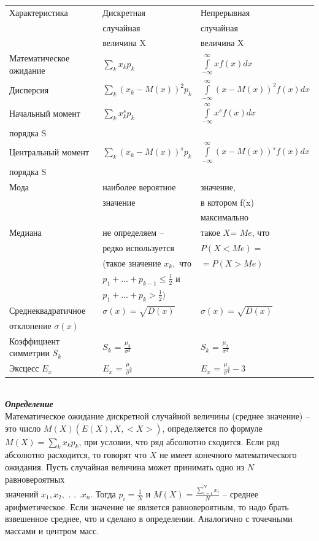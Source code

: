 \documentclass[russian, 12pt, fleqn]{article}
\begin{document}
\begin{tabular}[b]{ | l | l | l | }
\hline
Характеристика &  Дискретная & Непрерывная   \\
 &  случайная  & случайная  \\
 &  величина X  & величина X  \\
\hline
Математическое ожидание &  $ \sum\limits_{k} x_kp_k$ & $\int\limits_{-\infty}^{\infty}xf(x)dx$\\
Дисперсия & $\sum\limits_{k}^{}(x_k-M(x))^2p_k$ & $\int\limits_{-\infty}^{\infty}(x- M(x))^2f(x)dx$\\
Начальный момент & $\sum\limits_{k} x^s_kp_k$ & $\int\limits_{-\infty}^{\infty}x^sf(x)dx$\\
порядка S& &\\
Центральный момент& $\sum\limits_{k}^{}(x_k-M(x))^sp_k$& $\int\limits_{-\infty}^{\infty}(x- M(x))^sf(x)dx$\\
порядка S& &\\
Мода&наиболее вероятное&значение, \\
& значение& в котором f(x)\\
& &максимально\\
Медиана&не определяем -- &такое $X$= $Me$, что \\
&редко используется&$P(X < Me)=$\\
&(такое значение $x_k,$ что &  $=P(X > Me)$\\
& $p_1+ ...+p_{k - 1} \leq \frac{1}{2}$ и&\\
& $p_1+ ...+p_{k} > \frac{1}{2})$ & \\
Среднеквадратичное  & $\sigma(x) = \sqrt{D(x)}$ & $\sigma(x) = \sqrt{D(x)}$\\
отклонение $\sigma(x)$ & &\\
Коэффициент симметрии $S_k$ & $S_k$ = $\frac{\mu_3}{\sigma^3}$ &  $S_k$ = $\frac{\mu_3}{\sigma^3}$ \\
Эксцесс $E_x$ & $E_x$ = $\frac{\mu_4}{\sigma^4}$ & $E_x$ = $\frac{\mu_4}{\sigma^4} - 3$\\
\hline
\end{tabular}\\
\textit{\textbf{Определение}}\\
Математическое ожидание дискретной случайной величины (среднее значение) -- это число $M(X)(E(X), \overline{X} , <X>)$, определяется по формуле $M(X)=\sum\limits_{k}x_kp_k$, при условии, что ряд абсолютно сходится. Если ряд абсолютно расходится, то говорят что $X$ не имеет конечного математического ожидания. Пусть случайная величина может принимать одно из $N$ равновероятных \\ значений $x_1,x_2,$ . . .$x_n$. Тогда $p_i = \frac{1}{N}$ и $M(X) = \frac{\sum\limits_{i = 1}^{N}  x_i } { N }$ -- среднее арифметическое. Если значение не является равновероятным, то надо брать взвешенное среднее, что и сделано в определении. Аналогично с точечными массами и центром масс.\\
\end{document}
